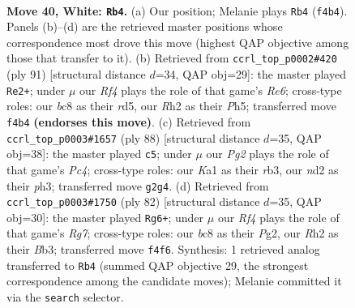 \documentclass[11pt]{article}
\begin{document}
\clearpage

\begin{figure}[p]\centering
\begin{subfigure}{0.46\textwidth}\centering
\resizebox{\linewidth}{!}{%
\newchessgame
\chessboard[
  setfen={r1b3k1/8/8/1r6/5R1p/7P/p2n2PR/K7 w - - 2 40},
  showmover=false,
  pgfstyle=straightmove, color=movearrow, markmove={f4-b4}
]}
\caption{}
\end{subfigure}\hfill
\begin{subfigure}{0.46\textwidth}\centering
\resizebox{\linewidth}{!}{%
\newchessgame
\chessboard[
  setfen={8/r2k4/1R1P2p1/3R1p1p/P7/4r1P1/1K6/8 b - - 1 46},
  showmover=false,
  pgfstyle=straightmove, color=movearrow, markmove={e3-e2}
]}
\caption{}
\end{subfigure}
\\[4pt]
\begin{subfigure}{0.46\textwidth}\centering
\resizebox{\linewidth}{!}{%
\newchessgame
\chessboard[
  setfen={8/5k2/p3p3/K5Pn/N1P1R3/1r5p/1P6/8 w - - 0 45},
  showmover=false,
  pgfstyle=straightmove, color=movearrow, markmove={c4-c5}
]}
\caption{}
\end{subfigure}\hfill
\begin{subfigure}{0.46\textwidth}\centering
\resizebox{\linewidth}{!}{%
\newchessgame
\chessboard[
  setfen={8/3b2R1/3k4/1p5p/4r3/1B2p2P/P3K1P1/8 w - - 3 42},
  showmover=false,
  pgfstyle=straightmove, color=movearrow, markmove={g7-g6}
]}
\caption{}
\end{subfigure}
\caption{\textbf{Move 40, White: \texttt{Rb4}.} (a) Our position; Melanie plays \texttt{Rb4} (\texttt{f4b4}). Panels (b)--(d) are the retrieved master positions whose correspondence most drove this move (highest QAP objective among those that transfer to it). (b) Retrieved from \texttt{ccrl\_top\_p0002\#420} (ply 91) [structural distance $d$=34, QAP obj=29]: the master played \texttt{Re2+}; under $\mu$ our \emph{Rf4} plays the role of that game's \emph{Re6}; cross-type roles: our \emph{b}c8 as their \emph{r}d5, our \emph{R}h2 as their \emph{P}h5; transferred move \texttt{f4b4} \textbf{(endorses this move)}. (c) Retrieved from \texttt{ccrl\_top\_p0003\#1657} (ply 88) [structural distance $d$=35, QAP obj=38]: the master played \texttt{c5}; under $\mu$ our \emph{Pg2} plays the role of that game's \emph{Pc4}; cross-type roles: our \emph{K}a1 as their \emph{r}b3, our \emph{n}d2 as their \emph{p}h3; transferred move \texttt{g2g4}. (d) Retrieved from \texttt{ccrl\_top\_p0003\#1750} (ply 82) [structural distance $d$=35, QAP obj=30]: the master played \texttt{Rg6+}; under $\mu$ our \emph{Rf4} plays the role of that game's \emph{Rg7}; cross-type roles: our \emph{b}c8 as their \emph{P}g2, our \emph{R}h2 as their \emph{B}b3; transferred move \texttt{f4f6}. Synthesis: 1 retrieved analog transferred to \texttt{Rb4} (summed QAP objective 29, the strongest correspondence among the candidate moves); Melanie committed it via the \texttt{search} selector.}
\label{fig:thought-m78}
\end{figure}
\end{document}
